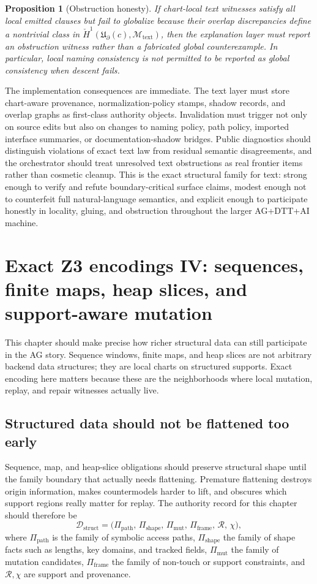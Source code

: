 \documentclass[11pt]{report}
\newtheorem{proposition}[definition]{Proposition}
\begin{document}
\begin{proposition}[Obstruction honesty]
If chart-local text witnesses satisfy all local emitted clauses but fail to globalize because their overlap discrepancies define a nontrivial class in $\check{H}^{1}(\mathfrak{U}_{\partial}(c),\mathscr{M}_{\mathrm{text}})$, then the explanation layer must report an obstruction witness rather than a fabricated global counterexample. In particular, local naming consistency is not permitted to be reported as global consistency when descent fails.
\end{proposition}

The implementation consequences are immediate. The text layer must store chart-aware provenance, normalization-policy stamps, shadow records, and overlap graphs as first-class authority objects. Invalidation must trigger not only on source edits but also on changes to naming policy, path policy, imported interface summaries, or documentation-shadow bridges. Public diagnostics should distinguish violations of exact text law from residual semantic disagreements, and the orchestrator should treat unresolved text obstructions as real frontier items rather than cosmetic cleanup. This is the exact structural family for text: strong enough to verify and refute boundary-critical surface claims, modest enough not to counterfeit full natural-language semantics, and explicit enough to participate honestly in locality, gluing, and obstruction throughout the larger AG+DTT+AI machine.

\chapter{Exact Z3 encodings IV: sequences, finite maps, heap slices, and support-aware mutation}
This chapter should make precise how richer structural data can still participate in the AG story. Sequence windows, finite maps, and heap slices are not arbitrary backend data structures; they are local charts on structured supports. Exact encoding here matters because these are the neighborhoods where local mutation, replay, and repair witnesses actually live.
\section{Structured data should not be flattened too early}
Sequence, map, and heap-slice obligations should preserve structural shape until the family boundary that actually needs flattening. Premature flattening destroys origin information, makes countermodels harder to lift, and obscures which support regions really matter for replay. The authority record for this chapter should therefore be
\[
\mathcal{D}_{\mathrm{struct}}
=
\bigl(
\Pi_{\mathrm{path}},\,
\Pi_{\mathrm{shape}},\,
\Pi_{\mathrm{mut}},\,
\Pi_{\mathrm{frame}},\,
\mathcal{R},\,
\chi
\bigr),
\]
where $\Pi_{\mathrm{path}}$ is the family of symbolic access paths, $\Pi_{\mathrm{shape}}$ the family of shape facts such as lengths, key domains, and tracked fields, $\Pi_{\mathrm{mut}}$ the family of mutation candidates, $\Pi_{\mathrm{frame}}$ the family of non-touch or support constraints, and $\mathcal{R},\chi$ are support and provenance.
\end{document}
